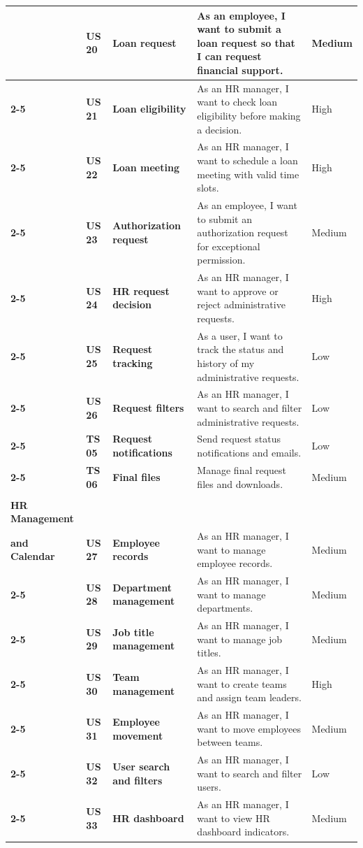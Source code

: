 \begin{longtable}{|>{\centering\bfseries}m{2.55cm}|>{\centering\bfseries}m{0.9cm}|>{\centering\bfseries}m{3.05cm}|m{6.75cm}|>{\centering\arraybackslash}m{1.45cm}|}
& US 20 & Loan request & As an employee, I want to submit a loan request so that I can request financial support. & Medium \\
\cline{2-5}
& US 21 & Loan eligibility & As an HR manager, I want to check loan eligibility before making a decision. & High \\
\cline{2-5}
& US 22 & Loan meeting & As an HR manager, I want to schedule a loan meeting with valid time slots. & High \\
\cline{2-5}
& US 23 & Authorization request & As an employee, I want to submit an authorization request for exceptional permission. & Medium \\
\cline{2-5}
& US 24 & HR request decision & As an HR manager, I want to approve or reject administrative requests. & High \\
\cline{2-5}
& US 25 & Request tracking & As a user, I want to track the status and history of my administrative requests. & Low \\
\cline{2-5}
& US 26 & Request filters & As an HR manager, I want to search and filter administrative requests. & Low \\
\cline{2-5}
& TS 05 & Request notifications & Send request status notifications and emails. & Low \\
\cline{2-5}
& TS 06 & Final files & Manage final request files and downloads. & Medium \\
\hline
\multirow{11}{=}{\centering\textbf{Sprint 4\\[4pt] HR Management\\and Calendar}}
& US 27 & Employee records & As an HR manager, I want to manage employee records. & Medium \\
\cline{2-5}
& US 28 & Department management & As an HR manager, I want to manage departments. & Medium \\
\cline{2-5}
& US 29 & Job title management & As an HR manager, I want to manage job titles. & Medium \\
\cline{2-5}
& US 30 & Team management & As an HR manager, I want to create teams and assign team leaders. & High \\
\cline{2-5}
& US 31 & Employee movement & As an HR manager, I want to move employees between teams. & Medium \\
\cline{2-5}
& US 32 & User search and filters & As an HR manager, I want to search and filter users. & Low \\
\cline{2-5}
& US 33 & HR dashboard & As an HR manager, I want to view HR dashboard indicators. & Medium \\

\end{longtable}
